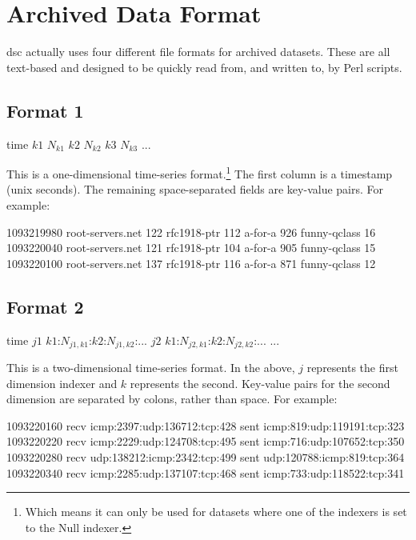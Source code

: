 \documentclass{report}
\def\dsc{{\sc dsc}}
\begin{document}
\section{Archived Data Format}

{\dsc} actually uses four different file formats for archived
datasets.  These are all text-based and designed to be quickly
read from, and written to, by Perl scripts.  

\subsection{Format 1}

\noindent
\begin{tt}time $k1$ $N_{k1}$ $k2$ $N_{k2}$ $k3$ $N_{k3}$ ...
\end{tt}

\vspace{1ex}\noindent
This is a one-dimensional time-series format.\footnote{Which means
it can only be used for datasets where one of the indexers is set
to the Null indexer.}  The first column is a timestamp (unix seconds).
The remaining space-separated fields are key-value pairs.  For
example:

\begin{MyVerbatim}
1093219980 root-servers.net 122 rfc1918-ptr 112 a-for-a 926 funny-qclass 16
1093220040 root-servers.net 121 rfc1918-ptr 104 a-for-a 905 funny-qclass 15
1093220100 root-servers.net 137 rfc1918-ptr 116 a-for-a 871 funny-qclass 12
\end{MyVerbatim}

\subsection{Format 2}

\noindent
\begin{tt}time $j1$ $k1$:$N_{j1,k1}$:$k2$:$N_{j1,k2}$:... $j2$ $k1$:$N_{j2,k1}$:$k2$:$N_{j2,k2}$:... ...
\end{tt}

\vspace{1ex}\noindent
This is a two-dimensional time-series format.  In the above,
$j$ represents the first dimension indexer and $k$ represents
the second.  Key-value pairs for the second dimension are
separated by colons, rather than space.  For example:

\begin{MyVerbatim}
1093220160 recv icmp:2397:udp:136712:tcp:428 sent icmp:819:udp:119191:tcp:323
1093220220 recv icmp:2229:udp:124708:tcp:495 sent icmp:716:udp:107652:tcp:350
1093220280 recv udp:138212:icmp:2342:tcp:499 sent udp:120788:icmp:819:tcp:364
1093220340 recv icmp:2285:udp:137107:tcp:468 sent icmp:733:udp:118522:tcp:341
\end{MyVerbatim}
\end{document}
